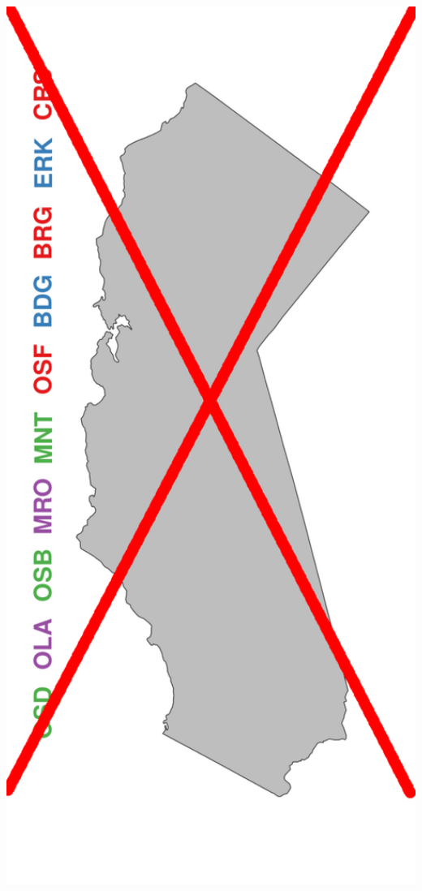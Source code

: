 \documentclass[ xcolor = pdftex, dvipsnames, table ]{beamer}
\begin{document}
\begin{frame}
{\begin{minipage}[h!]{0.19\textwidth}
\end{minipage}
\begin{minipage}[h!]{0.19\textwidth}
        \hspace*{0.25cm}
        \includegraphics[width=1.2\textwidth]{../pictures/mapLeapFrogNot.pdf}

\end{minipage}}
\end{frame}
\end{document}
